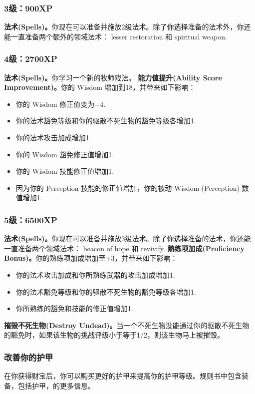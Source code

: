 \documentclass[letterpaper,twocolumn,openany,nodeprecatedcode]{dndbook}
\begin{document}
\subsubsection{3级：900XP}
\textbf{法术(Spells)。}你现在可以准备并施放2级法术。除了你选择准备的法术外，你还能一直准备两个额外的领域法术： lesser restoration 和 spiritual weapon.

\subsubsection{4级：2700XP}
\textbf{法术(Spells)。}你学习一个新的牧师戏法。
\textbf{能力值提升(Ability Score Improvement)。}你的 Wisdom 增加到18，并带来如下影响：
\begin{itemize}
\item 你的 Wisdom 修正值变为+4.
\item 你的法术豁免等级和你的驱散不死生物的豁免等级各增加1.
\item 你的法术攻击加成增加1.
\item 你的 Wisdom 豁免修正值增加1.
\item 你的 Wisdom 技能修正值增加1.
\item 因为你的 Perception 技能的修正值增加，你的被动 Wisdom (Perception) 数值增加1.
\end{itemize}

\subsubsection{5级：6500XP}
\textbf{法术(Spells)。}你现在可以准备并施放3级法术。除了你选择准备的法术，你还能一直准备两个领域法术： beacon of hope 和 revivify.
\textbf{熟练项加成(Proficiency Bonus)。}你的熟练项加成增加至+3，并带来如下影响：
\begin{itemize}
\item 你的法术攻击加成和你所熟练武器的攻击加成增加1.
\item 你的法术豁免等级和你的驱散不死生物的豁免等级各增加1.
\item 你所熟练的豁免和技能的修正值增加1.
\end{itemize}

\textbf{摧毁不死生物(Destroy Undead)。}当一个不死生物没能通过你的驱散不死生物的豁免时，如果该生物的挑战评级小于等于1/2，则该生物马上被摧毁。

\subsubsection{改善你的护甲}
在你获得财宝后，你可以购买更好的护甲来提高你的护甲等级。规则书中包含装备，包括护甲，的更多信息。
\end{document}
